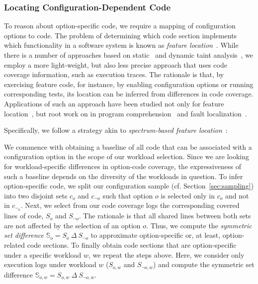 {{\subsubsection{Locating Configuration-Dependent Code}
To reason about option-specific code, we require a mapping of configuration options to code. 
The problem of determining which code section implements which functionality in a software system is known as \emph{feature location}~\cite{rubin_feature_2013}. 
While there is a number of approaches based on static~\cite{velez_2020_configcrusher_jase,lillack_2018_lotrack_tse,luo_2019_cova} and dynamic taint analysis~\cite{bell_phosphor_2014,velez_comprex_2021,splat_kim_2013}, we employ a more light-weight,  but also less precise approach that uses code coverage information, such as execution traces.
The rationale is that, by exercising feature code, for instance, by enabling configuration options or running corresponding tests, its location can be inferred from differences in code coverage. 
Applications of such an approach have been studied not only for feature location~\cite{wong_integrated_2005,sulir_annotation_2015,michelon_spectrum_2021,perez_framing_2016}, but root work on in program comprehension~\cite{wilde_early_1996,wilde_reconnaissance_1995,sherwood_reducing_nodate,perez_diagnosis_2014,castro_pangolin_2019} and fault localization~\cite{agrawal_fault_1995,wong_faultloc_2016}. 
}
Specifically, we follow  a strategy akin to  \textit{spectrum-based feature location}~\cite{michelon_spectrum_2021}:
{\color{edited}
We commence with obtaining a baseline of all code that can be associated with a configuration option in the scope of our workload selection. Since we are looking for workload-specific differences in option-code coverage, the expressiveness of such a baseline depends on the diversity of the workloads in question. To infer option-specific code, we split our configuration sample (cf. Section~\ref{sec:sampling}) into two disjoint sets $c_o$ and $c_{\neg o}$ such that option $o$ is selected only in $c_o$ and not in $c_{\neg_o}$. Next, we select from our code coverage logs the corresponding covered lines of code, $S_o$ and $S_{\neg o}$.  The rationale is that all shared lines between both sets are not affected by the selection of an option $o$. Thus, we compute the \textit{symmetric set difference} $\mathbb{S}_o = S_o~\Delta~S_{\neg o}$ to approximate option-specific or, at least, option-related code sections. To finally obtain code sections that are option-specific under a specific workload $w$, we repeat the steps above. Here, we consider only execution logs under workload $w$ ($S_{o, w}$ and $S_{\neg o, w}$) and compute the symmetric set difference $\mathbb{S}_{o,w}=S_{o,w}~\Delta~S_{\neg o, w}.$


}}

